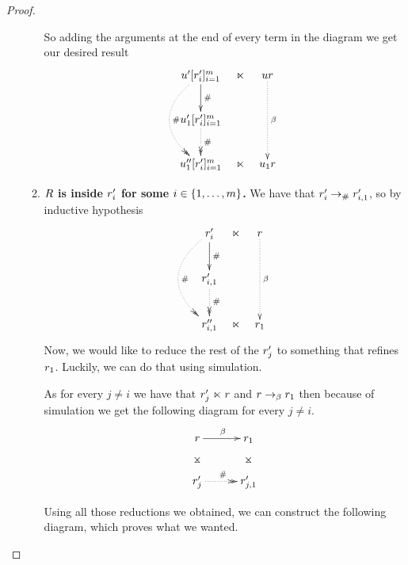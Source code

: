 \begin{proof}
\begin{enumerate}
\begin{enumerate}
  So adding the arguments at the end of every term in the diagram we get our desired result
  \[
  \xymatrix@C=.25cm{
  \tmthree' [\tmfour'_i]_{i=1}^m \ar[d]^{\dist} \ar@{.>>}@/_1cm/[dd]^{\dist} & \refines & \tmthree \tmfour \ar@{.>}[dd]^{\beta} \\
  \tmthree'_1 [\tmfour'_i]_{i=1}^m \ar@{.>>}[d]^{\dist} &           &           \\
  \tmthree''_1 [\tmfour'_i]_{i=1}^m & \refines  & \tmthree_1 \tmfour            \\
  }
  \]
  \item {\bf $R$ is inside $r'_i$ for some $i \in \{1, \hdots, m\}$.}
    We have that $r'_i \mathrel{\to_{\mathtt{\#}}} r'_{i, 1}$, so by inductive hypothesis
  \[
  \xymatrix@C=.25cm{
  \tmfour'_i \ar[d]^{\dist} \ar@{.>>}@/_1cm/[dd]^{\dist} & \refines & \tmfour \ar@{.>}[dd]^{\beta}\\
  \tmfour'_{i,1} \ar@{.>>}[d]^{\dist}                     &           &                             \\
  \tmfour''_{i,1}                                         & \refines  & \tmfour_1                   \\
  }
  \]
    Now, we would like to reduce the rest of the $r'_j$ to something that refines $r_1$.
    Luckily, we can do that using simulation.

    As for every $j \neq i$ we have that $r'_j \mathrel{\ltimes} r$ and
      $r \mathrel{\to_\beta} r_1$ then because of simulation we get the following diagram
      for every $j \neq i$.
    \[
    \xymatrix@C=1cm{
     \tmfour \ar@{}[d]|*=0[@]{\rtimes} \ar[r]^{\beta} & \tmfour_1 \ar@{}[d]|*=0[@]{\rtimes} \\
     \tmfour'_j \ar@{.>>}[r]^{\dist} & \tmfour'_{j,1} \\
    }
    \]

    Using all those reductions we obtained, we can construct the following diagram, which proves
    what we wanted.


\end{enumerate}
\end{enumerate}
\end{proof}
